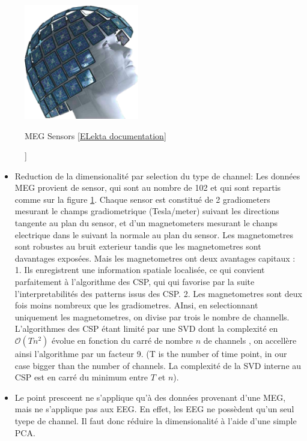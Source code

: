 \begin{figure}[ht]
    \centering
    \includegraphics[width=5cm]{images_report/sensor/sensors_elekta.png}
    \caption[MEG Sensors [\href{https://www.elekta.com/dam/jcr:ed6d88e7-cd3e-478e-9c4a-3f89ef90ec92/Elekta-Neuromag-TRIUX-Brochure.pdf}{ELekta documentation}]]%
    {MEG Sensors [\href{https://www.elekta.com/dam/jcr:ed6d88e7-cd3e-478e-9c4a-3f89ef90ec92/Elekta-Neuromag-TRIUX-Brochure.pdf}{ELekta documentation}]}
    \label{sensors_elekta}
\end{figure}

\begin{itemize}
    \item Reduction de la dimensionalité par selection du type de channel: Les données MEG provient de sensor, qui sont au nombre de 102 et qui sont repartis comme sur la figure \ref{sensors_elekta}. Chaque sensor est constitué de 2 gradiometers mesurant le champs gradiometrique (Tesla/meter) suivant les directions tangente au plan du sensor, et d'un magnetometers mesurant le chanps electrique dans le suivant la normale au plan du sensor. Les magnetometres sont robustes au bruit exterieur tandis que les magnetometres sont davantages exposées. Mais les magnetometres ont deux avantages capitaux : 1. Ils enregistrent une information spatiale localisée, ce qui convient parfaitement à l'algorithme des CSP, qui qui favorise par la suite l'interpretabilités des patterns issus des CSP. 2. Les magnetometres sont deux fois moins nombreux que les gradiometres. AInsi, en selectionnant uniquement les magnetometres, on divise par trois le nombre de channells. L'algorithmes des CSP étant limité par une SVD dont la complexité en $\mathcal{O}(T n^2)$ évolue en fonction du carré de nombre $n$ de channels \cite{dhillonalan}, on accellère ainsi l'algorithme par un facteur 9. (T is the number of time point, in our case bigger than the number of channels. La complexité de la SVD interne au CSP est en carré du minimum entre $T$ et $n$).
    \item Le point presceent ne s'applique qu'à des données provenant d'une MEG, mais ne s'applique pas aux EEG. En effet, les EEG ne possèdent qu'un seul tyepe de channel. Il faut donc réduire la dimensionalité à l'aide d'une simple PCA.
\end{itemize}


